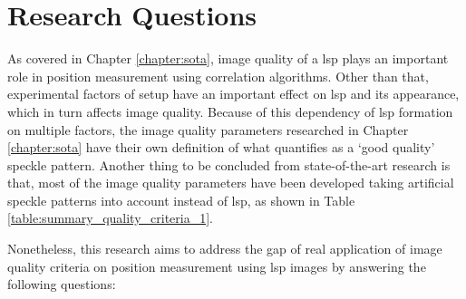 \chapter{Research Questions}\label{chap:research_question}

As covered in Chapter \ref{chapter:sota}, image quality of a \gls{lsp} plays an important role in position measurement using correlation algorithms. Other than that, experimental factors of setup have an important effect on \gls{lsp} and its appearance, which in turn affects image quality. Because of this dependency of \gls{lsp} formation on multiple factors, the image quality parameters researched in Chapter \ref{chapter:sota} have their own definition of what quantifies as a `good quality' speckle pattern. Another thing to be concluded from state-of-the-art research is that, most of the image quality parameters have been developed taking artificial speckle patterns into account instead of \gls{lsp}, as shown in Table \ref{table:summary_quality_criteria_1}. 

\vspace{5mm}
\noindent Nonetheless, this research aims to address the gap of real application of image quality criteria on position measurement using \gls{lsp} images by answering the following questions:

